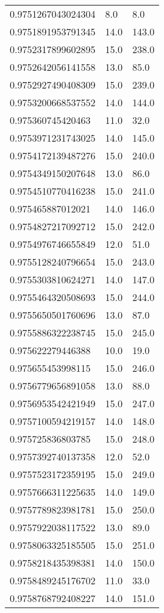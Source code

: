\begin{center}
\begin{supertabular}[H]{p{0.30\textwidth}p{0.05\textwidth}p{0.05\textwidth}}
0.9751267043024304 & 8.0 & 8.0 \\ 
0.9751891953791345 & 14.0 & 143.0 \\ 
0.9752317899602895 & 15.0 & 238.0 \\ 
0.9752642056141558 & 13.0 & 85.0 \\ 
0.9752927490408309 & 15.0 & 239.0 \\ 
0.9753200668537552 & 14.0 & 144.0 \\ 
0.975360745420463 & 11.0 & 32.0 \\ 
0.9753971231743025 & 14.0 & 145.0 \\ 
0.9754172139487276 & 15.0 & 240.0 \\ 
0.9754349150207648 & 13.0 & 86.0 \\ 
0.9754510770416238 & 15.0 & 241.0 \\ 
0.975465887012021 & 14.0 & 146.0 \\ 
0.9754827217092712 & 15.0 & 242.0 \\ 
0.9754976746655849 & 12.0 & 51.0 \\ 
0.9755128240796654 & 15.0 & 243.0 \\ 
0.9755303810624271 & 14.0 & 147.0 \\ 
0.9755464320508693 & 15.0 & 244.0 \\ 
0.9755650501760696 & 13.0 & 87.0 \\ 
0.9755886322238745 & 15.0 & 245.0 \\ 
0.975622279446388 & 10.0 & 19.0 \\ 
0.975655453998115 & 15.0 & 246.0 \\ 
0.9756779656891058 & 13.0 & 88.0 \\ 
0.9756953542421949 & 15.0 & 247.0 \\ 
0.9757100594219157 & 14.0 & 148.0 \\ 
0.975725836803785 & 15.0 & 248.0 \\ 
0.9757392740137358 & 12.0 & 52.0 \\ 
0.9757523172359195 & 15.0 & 249.0 \\ 
0.9757666311225635 & 14.0 & 149.0 \\ 
0.9757789823981781 & 15.0 & 250.0 \\ 
0.9757922038117522 & 13.0 & 89.0 \\ 
0.9758063325185505 & 15.0 & 251.0 \\ 
0.9758218435398381 & 14.0 & 150.0 \\ 
0.9758489245176702 & 11.0 & 33.0 \\ 
0.9758768792408227 & 14.0 & 151.0 \\ 

\end{supertabular}
\end{center}
